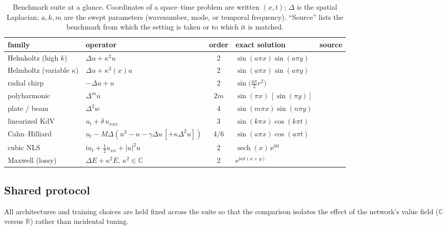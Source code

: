 \begin{table}[htbp]
\centering
\small
\caption{Benchmark suite at a glance. Coordinates of a space--time problem are
written \((x,t)\); \(\Delta\) is the spatial Laplacian; \(a,k,m\) are the swept
parameters (wavenumber, mode, or temporal frequency). ``Source'' lists the
benchmark from which the setting is taken or to which it is matched.}
\label{tab:suite}
\begin{tabular}{@{}l l c l l@{}}
\toprule
family & operator & order & exact solution & source \\
\midrule
Helmholtz (high \(k\)) & \(\Delta u + \kappa^2 u\) & 2 & \(\sin(a\pi x)\sin(a\pi y)\) & \cite{Wang2021Pathologies} \\
Helmholtz (variable \(\kappa\)) & \(\Delta u + \kappa^2(x)u\) & 2 & \(\sin(a\pi x)\sin(a\pi y)\) & \cite{Hao2024PINNacle} \\
radial chirp & \(-\Delta u + u\) & 2 & \(\sin\!\big(\tfrac{a\pi}{2}r^2\big)\) & \cite{Tancik2020Fourier,Liu2020MscaleDNN} \\
polyharmonic & \(\Delta^m u\) & \(2m\) & \(\sin(\pi x)\,[\sin(\pi y)]\) & \cite{Vahab2022Biharmonic} \\
plate / beam & \(\Delta^2 w\) & 4 & \(\sin(m\pi x)\sin(n\pi y)\) & \cite{Vahab2022Biharmonic} \\
linearized KdV & \(u_t + \delta\,u_{xxx}\) & 3 & \(\sin(k\pi x)\cos(k\pi t)\) & \cite{Raissi2019} \\
Cahn--Hilliard & \(u_t - M\Delta(u^3-u-\gamma\Delta u\,[+\kappa\Delta^2 u])\) & 4/6 & \(\sin(a\pi x)\cos(a\pi t)\) & \cite{Raissi2019,Hao2024PINNacle} \\
cubic NLS & \(\mathrm{i}u_t + \tfrac12 u_{xx} + |u|^2 u\) & 2 & \(\operatorname{sech}(x)\,\mathrm{e}^{\mathrm{i}kt}\) & \cite{Raissi2019} \\
Maxwell (lossy) & \(\Delta E + \kappa^2 E\), \(\kappa^2\in\mathbb{C}\) & 2 & \(\mathrm{e}^{\mathrm{i}a\pi(x+y)}\) & \cite{Jiang2024Maxwell} \\
\bottomrule
\end{tabular}
\end{table}

\subsection{Shared protocol}\label{sec:bm:protocol}

All architectures and training choices are held fixed across the suite so that
the comparison isolates the effect of the network's value field
(\(\mathbb{C}\) versus \(\mathbb{R}\)) rather than incidental tuning.

